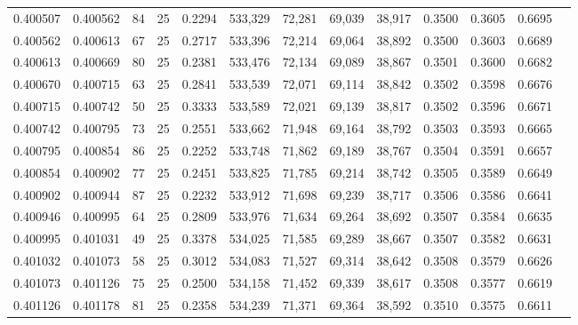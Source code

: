 \begin{tabular}{rrrrrrrrrrrrr}
0.400507 & 0.400562 &    84 &  25 &                                     0.2294 & 533,329 &  72,281 &  69,039 &  38,917 & 0.3500 & 0.3605 & 0.6695 \\
0.400562 & 0.400613 &    67 &  25 &                                     0.2717 & 533,396 &  72,214 &  69,064 &  38,892 & 0.3500 & 0.3603 & 0.6689 \\
0.400613 & 0.400669 &    80 &  25 &                                     0.2381 & 533,476 &  72,134 &  69,089 &  38,867 & 0.3501 & 0.3600 & 0.6682 \\
0.400670 & 0.400715 &    63 &  25 &                                     0.2841 & 533,539 &  72,071 &  69,114 &  38,842 & 0.3502 & 0.3598 & 0.6676 \\
0.400715 & 0.400742 &    50 &  25 &                                     0.3333 & 533,589 &  72,021 &  69,139 &  38,817 & 0.3502 & 0.3596 & 0.6671 \\
0.400742 & 0.400795 &    73 &  25 &                                     0.2551 & 533,662 &  71,948 &  69,164 &  38,792 & 0.3503 & 0.3593 & 0.6665 \\
0.400795 & 0.400854 &    86 &  25 &                                     0.2252 & 533,748 &  71,862 &  69,189 &  38,767 & 0.3504 & 0.3591 & 0.6657 \\
0.400854 & 0.400902 &    77 &  25 &                                     0.2451 & 533,825 &  71,785 &  69,214 &  38,742 & 0.3505 & 0.3589 & 0.6649 \\
0.400902 & 0.400944 &    87 &  25 &                                     0.2232 & 533,912 &  71,698 &  69,239 &  38,717 & 0.3506 & 0.3586 & 0.6641 \\
0.400946 & 0.400995 &    64 &  25 &                                     0.2809 & 533,976 &  71,634 &  69,264 &  38,692 & 0.3507 & 0.3584 & 0.6635 \\
0.400995 & 0.401031 &    49 &  25 &                                     0.3378 & 534,025 &  71,585 &  69,289 &  38,667 & 0.3507 & 0.3582 & 0.6631 \\
0.401032 & 0.401073 &    58 &  25 &                                     0.3012 & 534,083 &  71,527 &  69,314 &  38,642 & 0.3508 & 0.3579 & 0.6626 \\
0.401073 & 0.401126 &    75 &  25 &                                     0.2500 & 534,158 &  71,452 &  69,339 &  38,617 & 0.3508 & 0.3577 & 0.6619 \\
0.401126 & 0.401178 &    81 &  25 &                                     0.2358 & 534,239 &  71,371 &  69,364 &  38,592 & 0.3510 & 0.3575 & 0.6611 \\

\end{tabular}

